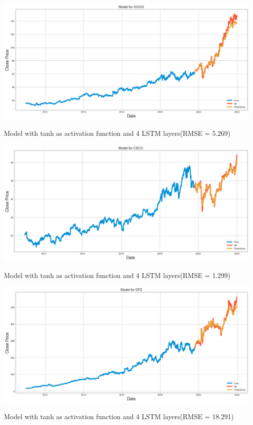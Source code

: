 \begin{center}
    \includegraphics[width=\textwidth]{google_results_01.png}
    \caption{Model with tanh as activation function and 4 LSTM layers(RMSE = 5.269)}
\end{center}

\begin{center}
    \includegraphics[width=\textwidth]{csco_results_01.png}
    \caption{Model with tanh as activation function and 4 LSTM layers(RMSE = 1.299)}
\end{center}

\begin{center}
    \includegraphics[width=\textwidth]{DPZ_results_01.png}
    \caption{Model with tanh as activation function and 4 LSTM layers(RMSE = 18.291)}
\end{center}

